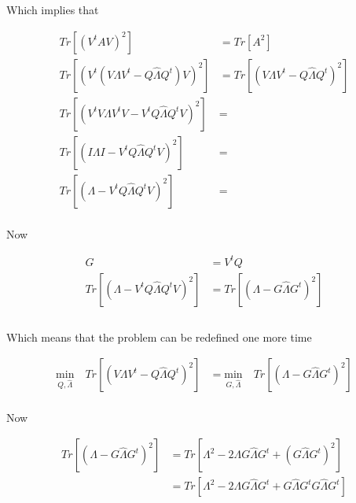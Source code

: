 \documentclass{article}
\begin{document}
    Which implies that

    \begin{equation*}
        \begin{aligned}
            Tr[(V^tAV)^2] &= Tr[A^2]\\
            Tr[(V^t(V\Lambda V^t - Q \hat{\Lambda} Q^t)V)^2] &= Tr[(V\Lambda V^t - Q \hat{\Lambda} Q^t)^2]\\
            Tr[(V^tV\Lambda V^tV - V^tQ \hat{\Lambda} Q^tV)^2] &=\\
            Tr[(I\Lambda I - V^tQ \hat{\Lambda} Q^tV)^2] &=\\
            Tr[(\Lambda - V^tQ \hat{\Lambda} Q^tV)^2] &=\\
        \end{aligned}
    \end{equation*}

    Now

    \begin{equation*}
        \begin{aligned}
            G &= V^tQ\\
            Tr[(\Lambda - V^tQ \hat{\Lambda} Q^tV)^2] &= Tr[(\Lambda - G \hat{\Lambda} G^t)^2]\\
        \end{aligned}
    \end{equation*}\\

    Which means that the problem can be redefined one more time

    \begin{equation*}
        \begin{aligned}
        \underset{Q,\hat{\Lambda}}{\text{min}} \quad Tr[(V\Lambda V^t - Q \hat{\Lambda} Q^t)^2]
        &=
        \underset{G,\hat{\Lambda}}{\text{min}} \quad Tr[(\Lambda - G \hat{\Lambda} G^t)^2]
        \end{aligned}
    \end{equation*}\\

    Now

    \begin{equation*}
        \begin{aligned}
        Tr[(\Lambda - G \hat{\Lambda} G^t)^2]
        &=
        Tr[\Lambda^2 - 2 \Lambda G \hat{\Lambda} G^t + (G \hat{\Lambda} G^t)^2]\\
        &=
        Tr[\Lambda^2 - 2 \Lambda G \hat{\Lambda} G^t + G \hat{\Lambda} G^t G \hat{\Lambda} G^t]\\
        \end{aligned}
    \end{equation*}
\end{document}
